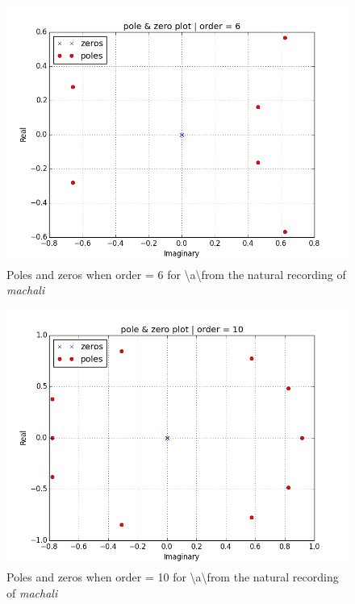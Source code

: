 \documentclass[a4paper]{article}
\begin{document}
\begin{figure}[h!]
    \includegraphics[width=\linewidth]{./images/a_pole-zero_6_.png}
    \caption{Poles and zeros when order = 6 for \textbackslash a\textbackslash from the natural recording of \textit{machali}}
    \label{fig:1}
\end{figure}


\begin{figure}[h!]
    \includegraphics[width=\linewidth]{./images/a_pole-zero_10_.png}
    \caption{Poles and zeros when order = 10 for \textbackslash a\textbackslash from the natural recording of \textit{machali}}
    \label{fig:1}
\end{figure}
\end{document}
